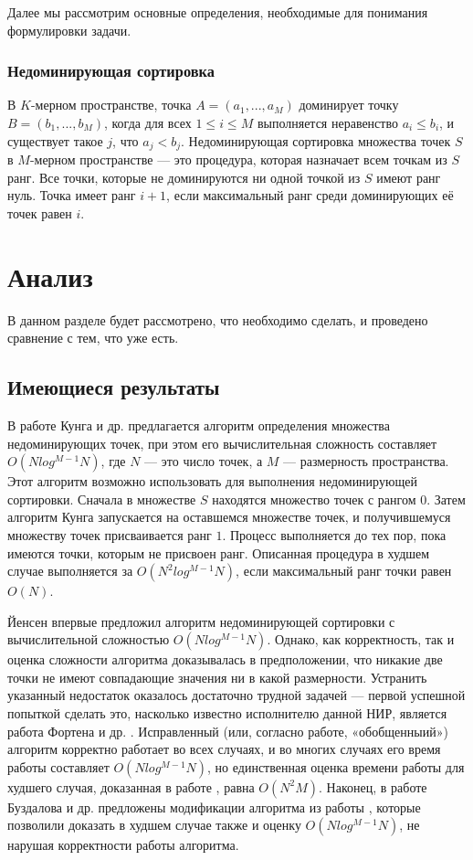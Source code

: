 Далее мы рассмотрим основные определения, необходимые для понимания формулировки задачи. 

\subsubsection{Недоминирующая сортировка}
В $K$-мерном пространстве, точка $A = (a_1,...,a_M)$ доминирует точку $B = (b_1,...,b_M)$, когда для всех $1 \leq i \leq M$ выполняется неравенство $a_i\leq b_i$, и существует такое $j$, что $a_j < b_j$. Недоминирующая сортировка множества точек $S$ в $M$-мерном пространстве — это процедура, которая назначает всем точкам из $S$ ранг. Все точки, которые не доминируются ни одной точкой из $S$ имеют ранг нуль. Точка имеет ранг $i+1$, если максимальный ранг среди доминирующих её точек равен $i$.

\section{Анализ}

В данном разделе будет рассмотрено, что необходимо сделать, и проведено сравнение с тем, что уже есть.

\subsection{Имеющиеся результаты}
В работе Кунга и др. \cite{Kung} предлагается алгоритм определения множества недоминирующих точек, при этом его вычислительная сложность составляет $O(N log^{M-1} N)$, где $N$ — это число точек, а $M$ — размерность пространства. Этот алгоритм возможно использовать для выполнения недоминирующей сортировки. Сначала в множестве $S$ находятся множество точек с рангом $0$. Затем алгоритм Кунга запускается на оставшемся множестве точек, и получившемуся множеству точек присваивается ранг $1$. Процесс выполняется до тех пор, пока имеются точки, которым не присвоен ранг. Описанная процедура в худшем случае выполняется за $O(N^2 log^{M-1} N)$, если максимальный ранг точки равен $O(N)$.

Йенсен \cite{Jensen} впервые предложил алгоритм недоминирующей сортировки с вычислительной сложностью $O(N log^{M-1} N)$. Однако, как корректность, так и оценка сложности алгоритма доказывалась в предположении, что никакие две точки не имеют совпадающие значения ни в какой размерности. Устранить указанный недостаток оказалось достаточно трудной задачей — первой успешной попыткой сделать это, насколько известно исполнителю данной НИР, является работа Фортена и др. \cite{Forton}. Исправленный (или, согласно работе, «обобщенныий») алгоритм корректно работает во всех случаях, и во многих случаях его время работы составляет $O(N log^{M-1} N)$, но единственная оценка времени работы для худшего случая, доказанная в работе \cite{Jensen}, равна $O(N^2M)$. Наконец, в работе Буздалова и др. \cite{Buzdalov} предложены модификации алгоритма из работы \cite{Jensen}, которые позволили доказать в худшем случае также и оценку $O(N log^{M-1} N)$, не нарушая корректности работы алгоритма.

